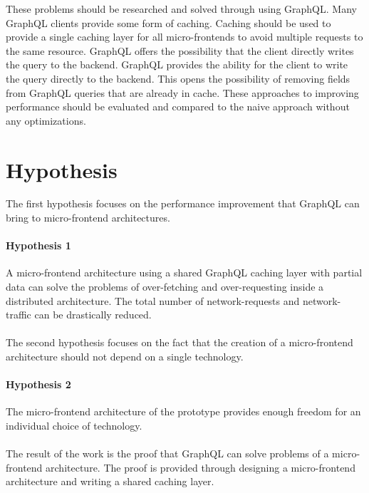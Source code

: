 These problems should be researched and solved through using GraphQL. Many GraphQL clients provide some form of caching. Caching should be used to provide a single caching layer for all micro-frontends to avoid multiple requests to the same resource. GraphQL offers the possibility that the client directly writes the query to the backend. GraphQL provides the ability for the client to write the query directly to the backend. This opens the possibility of removing fields from GraphQL queries that are already in cache. These approaches to improving performance should be evaluated and compared to the naive approach without any optimizations.

\section{Hypothesis}

The first hypothesis focuses on the performance improvement that GraphQL can bring to micro-frontend architectures.

\paragraph{Hypothesis 1} 
A micro-frontend architecture using a shared GraphQL caching layer with partial data can solve the problems of over-fetching and over-requesting inside a distributed architecture. The total number of network-requests and network-traffic can be drastically reduced.\\\\

The second hypothesis focuses on the fact that the creation of a micro-frontend architecture should not depend on a single technology.

\paragraph{Hypothesis 2}
The micro-frontend architecture of the prototype provides enough freedom for an individual choice of technology.\\\\

The result of the work is the proof that GraphQL can solve problems of a micro-frontend architecture. The proof is provided through designing a micro-frontend architecture and writing a shared caching layer.
